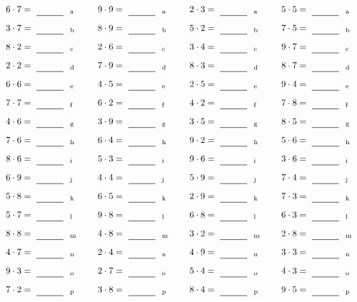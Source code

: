 \documentclass
[
  draft    = true,
  fontsize = 11pt,
  parskip  = half-
]
{scrartcl}
\begin{document}
\par\vfill\par
\begin{align*}
    \pline{6\cdot7}&=\rline{a}
  & \pline{9\cdot9}&=\rline{a}
  & \pline{2\cdot3}&=\rline{a}
  & \pline{5\cdot5}&=\rline{a} \\[1ex]
    \pline{3\cdot7}&=\rline{b}
  & \pline{8\cdot9}&=\rline{b}
  & \pline{5\cdot2}&=\rline{b}
  & \pline{7\cdot5}&=\rline{b} \\[1ex]
    \pline{8\cdot2}&=\rline{c}
  & \pline{2\cdot6}&=\rline{c}
  & \pline{3\cdot4}&=\rline{c}
  & \pline{9\cdot7}&=\rline{c} \\[1ex]
    \pline{2\cdot2}&=\rline{d}
  & \pline{7\cdot9}&=\rline{d}
  & \pline{8\cdot3}&=\rline{d}
  & \pline{8\cdot7}&=\rline{d} \\[1ex]
    \pline{6\cdot6}&=\rline{e}
  & \pline{4\cdot5}&=\rline{e}
  & \pline{2\cdot5}&=\rline{e}
  & \pline{9\cdot4}&=\rline{e} \\[1ex]
    \pline{7\cdot7}&=\rline{f}
  & \pline{6\cdot2}&=\rline{f}
  & \pline{4\cdot2}&=\rline{f}
  & \pline{7\cdot8}&=\rline{f} \\[1ex]
    \pline{4\cdot6}&=\rline{g}
  & \pline{3\cdot9}&=\rline{g}
  & \pline{3\cdot5}&=\rline{g}
  & \pline{8\cdot5}&=\rline{g} \\[1ex]
    \pline{7\cdot6}&=\rline{h}
  & \pline{6\cdot4}&=\rline{h}
  & \pline{9\cdot2}&=\rline{h}
  & \pline{5\cdot6}&=\rline{h} \\[1ex]
    \pline{8\cdot6}&=\rline{i}
  & \pline{5\cdot3}&=\rline{i}
  & \pline{9\cdot6}&=\rline{i}
  & \pline{3\cdot6}&=\rline{i} \\[1ex]
    \pline{6\cdot9}&=\rline{j}
  & \pline{4\cdot4}&=\rline{j}
  & \pline{5\cdot9}&=\rline{j}
  & \pline{7\cdot4}&=\rline{j} \\[1ex]
    \pline{5\cdot8}&=\rline{k}
  & \pline{6\cdot5}&=\rline{k}
  & \pline{2\cdot9}&=\rline{k}
  & \pline{7\cdot3}&=\rline{k} \\[1ex]
    \pline{5\cdot7}&=\rline{l}
  & \pline{9\cdot8}&=\rline{l}
  & \pline{6\cdot8}&=\rline{l}
  & \pline{6\cdot3}&=\rline{l} \\[1ex]
    \pline{8\cdot8}&=\rline{m}
  & \pline{4\cdot8}&=\rline{m}
  & \pline{3\cdot2}&=\rline{m}
  & \pline{2\cdot8}&=\rline{m} \\[1ex]
    \pline{4\cdot7}&=\rline{n}
  & \pline{2\cdot4}&=\rline{n}
  & \pline{4\cdot9}&=\rline{n}
  & \pline{3\cdot3}&=\rline{n} \\[1ex]
    \pline{9\cdot3}&=\rline{o}
  & \pline{2\cdot7}&=\rline{o}
  & \pline{5\cdot4}&=\rline{o}
  & \pline{4\cdot3}&=\rline{o} \\[1ex]
    \pline{7\cdot2}&=\rline{p}
  & \pline{3\cdot8}&=\rline{p}
  & \pline{8\cdot4}&=\rline{p}
  & \pline{9\cdot5}&=\rline{p}
\end{align*}
\end{document}
